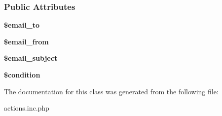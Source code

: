 \subsubsection*{Public Attributes}
\begin{DoxyCompactItemize}
\item 
\hypertarget{classemail__form__values_a9dc3bcda67c6991a1921625bb98104b2}{{\bfseries \$email\-\_\-to}}\label{classemail__form__values_a9dc3bcda67c6991a1921625bb98104b2}

\item 
\hypertarget{classemail__form__values_a84fd64db80e840d61d3a72366aeb8663}{{\bfseries \$email\-\_\-from}}\label{classemail__form__values_a84fd64db80e840d61d3a72366aeb8663}

\item 
\hypertarget{classemail__form__values_af3e8497390e4edc1ff077f9cd3140323}{{\bfseries \$email\-\_\-subject}}\label{classemail__form__values_af3e8497390e4edc1ff077f9cd3140323}

\item 
\hypertarget{classemail__form__values_a18ace2749c6d9fbcc99d6486c8db4d0e}{{\bfseries \$condition}}\label{classemail__form__values_a18ace2749c6d9fbcc99d6486c8db4d0e}

\end{DoxyCompactItemize}


The documentation for this class was generated from the following file\-:\begin{DoxyCompactItemize}
\item 
actions.\-inc.\-php\end{DoxyCompactItemize}
